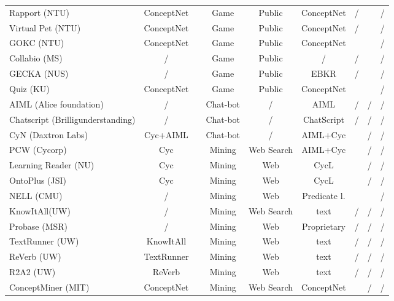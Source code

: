 \begin{landscape}
\begin{table}[htb]
\begin{adjustbox}{width=1.4\textwidth}
\begin{tabular}{lclcccccc}
		Rapport (NTU) & ConceptNet &  \parencite{Kuo2009}  & Game & Public  & ConceptNet  & /  & \checkmark  & /  \\
		Virtual Pet (NTU) & ConceptNet  &  \parencite{Kuo2009}  & Game &  Public & ConceptNet  & /  & \checkmark  & /  \\
		GOKC (NTU) & ConceptNet  & \parencite{Kuo2010}  & Game & Public  & ConceptNet  & \checkmark  & \checkmark  & /  \\
		Collabio (MS) & /  & \parencite{Bernstein2010}  & Game & Public  & /  & /  & \checkmark  & /  \\
		GECKA (NUS) & /  & \parencite{Cambria2015}  & Game & Public  & EBKR  & /  & \checkmark  & /  \\
		Quiz (KU) & ConceptNet  & \parencite{Otani2016}  & Game & Public  & ConceptNet  & \checkmark  & \checkmark  & /  \\
		AIML (Alice foundation) & /  & \parencite{Wallace2003}  & Chat-bot & /  & AIML  & /  & /  & /  \\
		Chatscript (Brilligunderstanding) & /  & \parencite{Wilcox2011}  & Chat-bot & /  & ChatScript  & /  & /  & /  \\
		CyN (Daxtron Labs) & Cyc+AIML  & \parencite{Wilcox2011}  & Chat-bot & /  & AIML+Cyc  & \checkmark  & /  & /  \\
	    PCW (Cycorp) & Cyc  & \parencite{Matuszek2004}  & Mining & Web Search  & AIML+Cyc  & \checkmark  & /  & /  \\
 		Learning Reader (NU) & Cyc & \parencite{Forbus2007} & Mining & Web & CycL & \checkmark & / & / \\
 		OntoPlus (JSI) & Cyc & \parencite{Novalija2011} & Mining & Web & CycL & \checkmark & / & / \\
		NELL (CMU) & / & \parencite{Mitchell2015} & Mining & Web & Predicate l. & \checkmark & \checkmark & / \\ 
		KnowItAll(UW) & / & \parencite{Etzioni2004} & Mining & Web Search & text & / & / & / \\
		Probase (MSR) & / & \parencite{Wu2012}  & Mining & Web & Proprietary & / & / & / \\
        TextRunner (UW) & KnowItAll & \parencite{Soderland2007} & Mining & Web & text & / & / & / \\
		ReVerb (UW) & TextRunner & \parencite{Fader2011} & Mining & Web & text & / & / & / \\
		R2A2 (UW) & ReVerb & \parencite{Etzioni2011} & Mining & Web & text & / & / & / \\
		ConceptMiner (MIT) & ConceptNet & \parencite{Eslick2006} &Mining & Web Search & ConceptNet & \checkmark & / & / \\ 

\end{tabular}
\end{adjustbox}
\end{table}
\end{landscape}
